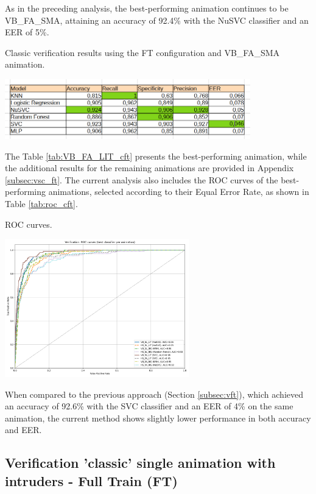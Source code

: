 \documentclass[12pt]{report}
\begin{document}
As in the preceding analysis, the best-performing animation continues to be VB\_FA\_SMA, attaining an accuracy of 92.4\% with the NuSVC classifier and an EER of 5\%.

\begin{table}[ht]
    \centering
    \caption{Classic verification results using the FT configuration and VB\_FA\_SMA animation.}
    \includegraphics[width=0.8\textwidth]{Images/Results/Classic_procedure/Verification_single/ft/VB_FA_LIT.png}
    \label{tab:VB_FA_LIT_cft}
\end{table}

The Table \ref{tab:VB_FA_LIT_cft} presents the best-performing animation, while the additional results for the remaining animations are provided in Appendix \ref{subsec:vsc_ft}.
The current analysis also includes the ROC curves of the best-performing animations, selected according to their Equal Error Rate, as shown in Table \ref{tab:roc_cft}.

\begin{table}[ht]
    \centering
    \caption{ROC curves.}
    \includegraphics[width=0.6\textwidth]{Images/Results/Classic_procedure/Verification_single/ft/Verification_single_roc_classic_ft.png}
    \label{tab:roc_cft}
\end{table}

When compared to the previous approach (Section \ref{subsec:vft}), which achieved an accuracy of 92.6\% with the SVC classifier and an EER of 4\% on the same animation, the current method shows slightly lower performance in both accuracy and EER.
\FloatBarrier

\subsection{Verification 'classic' single animation with intruders - Full Train (FT)}
\end{document}
